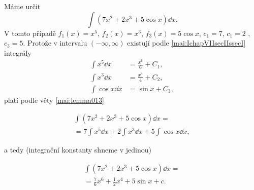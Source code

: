 \begin{mdframed}[style=mdexam]
  \begin{example}\label{MAI:exam142}
    Máme určit 
    \begin{equation*}
      \int(7x^2+2x^3+5\cos x)\dd{x}.
    \end{equation*} 
    V tomto případě \(f_1(x) = x^5\), \(f_2(x) = x^3\), \(f_3(x) = 5\cos x\), \(c_1=7\), \(c_1=2\) ,
    \(c_3=5\). Protože v intervalu \((-\infty, \infty)\) existují podle
    \eqref{mai:IchapVIIsecIIssecI} integrály
    \begin{align*}
      \int x^5\dd{x}   &= \frac{x^6}{6} + C_1, \\
      \int x^3\dd{x}   &= \frac{x^4}{4} + C_2, \\
      \int\cos x\dd{x} &= \sin x +C_3,
    \end{align*}
    platí podle věty \eqref{mai:lemma013} 
    \begin{fleqn}[0pt]
      \begin{multline*}
        \int(7x^2+2x^3+5\cos x)\dd{x} = \\
          = 7\int x^5\dd{x} + 2\int x^3\dd{x} + 5\int\cos x\dd{x},
      \end{multline*}
    \end{fleqn}
      a tedy (integrační konstanty shneme v jedinou)
      \begin{fleqn}[0pt]
        \begin{multline*}
          \int(7x^2+2x^3+5\cos x)\dd{x} = \\
            = \frac{7}{6}x^6 + \frac{1}{2}x^4 + 5\sin x + c.
        \end{multline*}
      \end{fleqn}
  \end{example}
\end{mdframed}